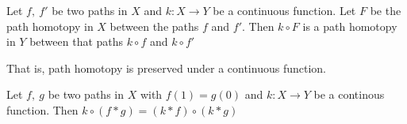 \begin{lemma}
	Let $f,\ f'$ be two paths in $X$ and $k : X \to Y$ be a continuous function. Let $F$ be the path homotopy in $X$ between the paths $f$ and $f'$. Then $k \circ{} F$ is a path homotopy in $Y$ between that paths $k \circ{} f$ and $k \circ{} f'$
	\begin{commentary} That is, path homotopy is preserved under a continuous function.\end{commentary}
\end{lemma}

\begin{lemma}
	Let $f,\ g$ be two paths in $X$ with $f(1) = g(0)$ and $k : X \to Y$ be a continous function. Then $k \circ{} (f \ast{} g) = (k \ast{} f) \circ{} (k \ast{} g)$
\end{lemma}

